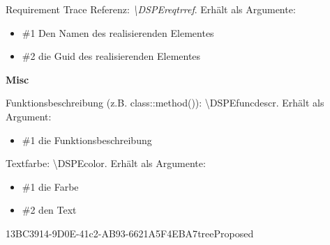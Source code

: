 {Requirement Trace Referenz: \textit{\textbackslash{}DSPEreqtrref}. Erhält als Argumente:
\begin{itemize}
	\item \#1 Den Namen des realisierenden Elementes
\end{itemize}
\begin{itemize}
	\item \#2 die Guid des realisierenden Elementes
\end{itemize}

\textbf{Misc}

Funktionsbeschreibung (z.B. class::method()): \textbackslash{}DSPEfuncdescr. Erhält als Argument:
\begin{itemize}
	\item \#1 die Funktionsbeschreibung
\end{itemize}

Textfarbe: \textbackslash{}DSPEcolor. Erhält als Argumente:
\begin{itemize}
	\item \#1 die Farbe
	\item \#2 den Text
\end{itemize}

                              }{13BC3914-9D0E-41c2-AB93-6621A5F4EBA7}{tree}{}{Proposed}

